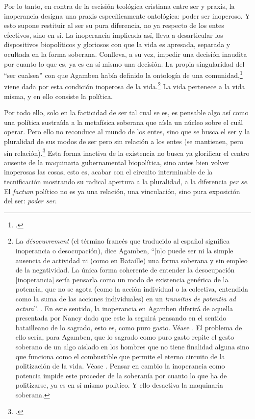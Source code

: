 Por lo tanto, en contra de la escisión teológica cristiana entre ser y praxis, la inoperancia designa una praxis específicamente ontológica: poder ser inoperoso. Y esto supone restituir al ser su pura diferencia, no ya respecto de los entes efectivos, sino en sí. La inoperancia implicada así, lleva a desarticular los dispositivos biopolíticos y gloriosos con que la vida es apresada, separada y ocultada en la forma soberana. Conlleva, a su vez, impedir una decisión inaudita por cuanto lo que es, ya es en sí mismo una decisión. La propia singularidad del \enquote{ser cualsea} con que Agamben había definido la ontología de una comunidad,\footcite[Véase][7 a 9]{@7089-KARMYBOLTON2010} viene dada por esta condición inoperosa de la vida.\footnote{La \emph{désoeuvrement} (el término francés que traducido al español significa inoperancia o desocupación), dice Agamben, \enquote{{[}n{]}o puede ser ni la simple ausencia de actividad ni (como en Bataille) una forma soberana y sin empleo de la negatividad. La única forma coherente de entender la desocupación {[}inoperancia{]} sería pensarla como un modo de existencia genérica de la potencia, que no se agota (como la acción individual o la colectiva, entendida como la suma de las acciones individuales) en un \emph{transitus de potentia ad actum}}. \cite[][82]{@7101-AGAMBEN2003}. En este sentido, la inoperancia en Agamben diferirá de aquella presentada por Nancy dado que este la seguirá pensando en el sentido batailleano de lo sagrado, esto es, como puro gasto. Véase \cite[][43-46]{@7100-NANCY2000}. El problema de ello sería, para Agamben, que lo sagrado como puro gasto repite el gesto soberano de un algo aislado en los hombres que no tiene finalidad alguna sino que funciona como el combustible que permite el eterno circuito de la politización de la vida. Véase \cite[][144-147]{@7101-AGAMBEN2003}. Pensar en cambio la inoperancia como potencia impide este proceder de la soberanía por cuanto lo que ha de politizarse, ya es en sí mismo político. Y ello desactiva la maquinaria soberana.} La vida pertenece a la vida misma, y en ello consiste la política.

Por todo ello, solo en la facticidad de ser tal cual se es, es pensable algo así como una política sustraída a la metafísica soberana que aísla un núcleo sobre el cuál operar. Pero ello no reconduce al mundo de los entes, sino que se busca el ser y la pluralidad de sus modos de ser pero sin relación a los entes (se mantienen, pero sin relación).\footcite[][82]{@7094-AGAMBEN2003} Esta forma inactiva de la existencia  no busca ya glorificar el centro ausente de la maquinaria gubernamental biopolítica, sino antes bien volver inoperosas las cosas, esto es, acabar con el circuito interminable de la tecnificación mostrando su radical apertura a la pluralidad, a la diferencia \emph{per se}. El \emph{factum} político no es ya una relación, una vinculación, sino pura exposición del ser: \emph{poder ser}.

